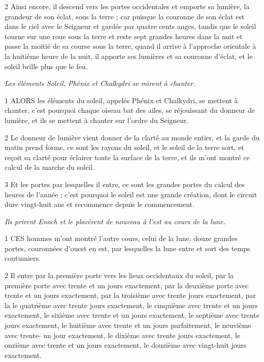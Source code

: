 \par 2 Ainsi encore, il descend vers les portes occidentales et emporte sa lumière, la grandeur de son éclat, sous la terre ; car puisque la couronne de son éclat est dans le ciel avec le Seigneur et gardée par quatre cents anges, tandis que le soleil tourne sur une roue sous la terre et reste sept grandes heures dans la nuit et passe la moitié de sa course sous la terre, quand il arrive à l'approche orientale à la huitième heure de la nuit, il apporte ses lumières et sa couronne d'éclat, et le soleil brille plus que le feu.


\par \textit{Les éléments Soleil, Phénix et Chalkydri se mirent à chanter.}

\par 1 ALORS les éléments du soleil, appelés Phénix et Chalkydri, se mettent à chanter, c'est pourquoi chaque oiseau bat des ailes, se réjouissant du donneur de lumière, et ils se mettent à chanter sur l'ordre du Seigneur.

\par 2 Le donneur de lumière vient donner de la clarté au monde entier, et la garde du matin prend forme, ce sont les rayons du soleil, et le soleil de la terre sort, et reçoit sa clarté pour éclairer toute la surface de la terre, et ils m'ont montré ce calcul de la marche du soleil.

\par 3 Et les portes par lesquelles il entre, ce sont les grandes portes du calcul des heures de l'année ; c'est pourquoi le soleil est une grande création, dont le circuit dure vingt-huit ans et recommence depuis le commencement.


\par \textit{Ils prirent Enoch et le placèrent de nouveau à l'est au cours de la lune.}

\par 1 CES hommes m'ont montré l'autre cours, celui de la lune, douze grandes portes, couronnées d'ouest en est, par lesquelles la lune entre et sort des temps coutumiers.

\par 2 Il entre par la première porte vers les lieux occidentaux du soleil, par la première porte avec trente et un jours exactement, par la deuxième porte avec trente et un jours exactement, par la troisième avec trente jours exactement, par la le quatrième avec trente jours exactement, le cinquième avec trente et un jours exactement, le sixième avec trente et un jours exactement, le septième avec trente jours exactement, le huitième avec trente et un jours parfaitement, le neuvième avec trente- un jour exactement, le dixième avec trente jours exactement, le onzième avec trente et un jours exactement, le douzième avec vingt-huit jours exactement.

